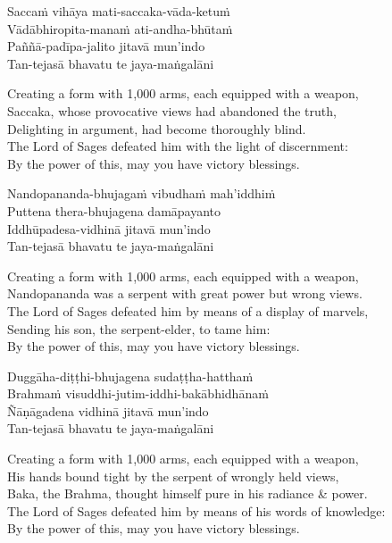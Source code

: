 Saccaṁ vihāya mati-saccaka-vāda-ketuṁ\\
Vādābhiropita-manaṁ ati-andha-bhūtaṁ\\
Paññā-padīpa-jalito jitavā mun'indo\\
Tan-tejasā bhavatu te jaya-maṅgalāni

\begin{english}
  Creating a form with 1,000 arms, each equipped with a weapon,\\
  Saccaka, whose provocative views had abandoned the truth,\\
  Delighting in argument, had become thoroughly blind.\\
  The Lord of Sages defeated him with the light of discernment:\\
  By the power of this, may you have victory blessings.
\end{english}

Nandopananda-bhujagaṁ vibudhaṁ mah'iddhiṁ\\
Puttena thera-bhujagena damāpayanto\\
Iddhūpadesa-vidhinā jitavā mun'indo\\
Tan-tejasā bhavatu te jaya-maṅgalāni

\begin{english}
  Creating a form with 1,000 arms, each equipped with a weapon,\\
  Nandopananda was a serpent with great power but wrong views.\\
  The Lord of Sages defeated him by means of a display of marvels,\\
  Sending his son, the serpent-elder, to tame him:\\
  By the power of this, may you have victory blessings.
\end{english}

Duggāha-diṭṭhi-bhujagena sudaṭṭha-hatthaṁ\\
Brahmaṁ visuddhi-jutim-iddhi-bakābhidhānaṁ\\
Ñāṇāgadena vidhinā jitavā mun'indo\\
Tan-tejasā bhavatu te jaya-maṅgalāni

\begin{english}
  Creating a form with 1,000 arms, each equipped with a weapon,\\
  His hands bound tight by the serpent of wrongly held views,\\
  Baka, the Brahma, thought himself pure in his radiance \& power.\\
  The Lord of Sages defeated him by means of his words of knowledge:\\
  By the power of this, may you have victory blessings.
\end{english}


